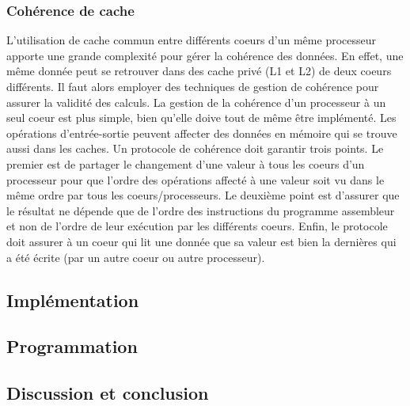 \subsubsection{Cohérence de cache}
L'utilisation de cache commun entre différents coeurs d'un même processeur apporte une grande complexité pour gérer la cohérence des données. En effet, une même donnée peut se retrouver dans des cache privé (L1 et L2) de deux coeurs différents. Il faut alors employer des techniques de gestion de cohérence pour assurer la validité des calculs. La gestion de la cohérence d'un processeur à un seul coeur est plus simple, bien qu'elle doive tout de même être implémenté. Les opérations d'entrée-sortie peuvent affecter des données en mémoire qui se trouve aussi dans les caches. Un protocole de cohérence doit garantir trois points. Le premier est de partager le changement d'une valeur à tous les coeurs d'un processeur pour que l'ordre des opérations affecté à une valeur soit vu dans le même ordre par tous les coeurs/processeurs. Le deuxième point est d'assurer que le résultat ne dépende que de l'ordre des instructions du programme assembleur et non de l'ordre de leur exécution par les différents coeurs. Enfin, le protocole doit assurer à un coeur qui lit une donnée que sa valeur est bien la dernières qui a été écrite (par un autre coeur ou autre processeur). 



\subsection{Implémentation}

\subsection{Programmation}

\subsection{Discussion et conclusion}

